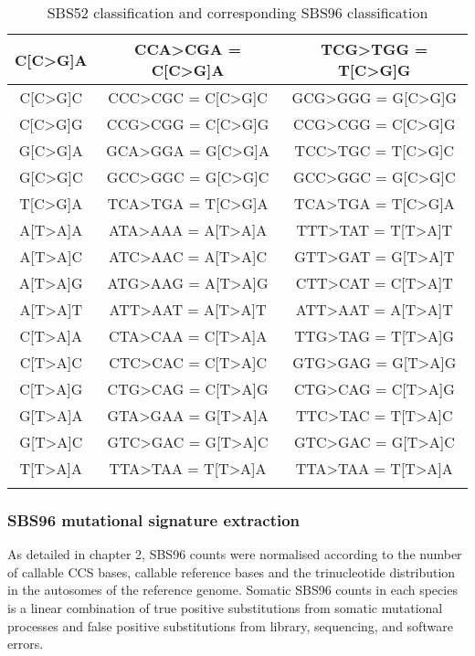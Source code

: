 \begin{longtable}{c|c|c}
\ttfamily C[C>G]A & \ttfamily CCA>CGA = C[C>G]A & \ttfamily TCG>TGG = T[C>G]G \\ \hline
\ttfamily C[C>G]C & \ttfamily CCC>CGC = C[C>G]C & \ttfamily GCG>GGG = G[C>G]G \\ \hline
\ttfamily C[C>G]G & \ttfamily CCG>CGG = C[C>G]G & \ttfamily CCG>CGG = C[C>G]G \\ \hline
\ttfamily G[C>G]A & \ttfamily GCA>GGA = G[C>G]A & \ttfamily TCC>TGC = T[C>G]C \\ \hline
\ttfamily G[C>G]C & \ttfamily GCC>GGC = G[C>G]C & \ttfamily GCC>GGC = G[C>G]C \\ \hline
\ttfamily T[C>G]A & \ttfamily TCA>TGA = T[C>G]A & \ttfamily TCA>TGA = T[C>G]A \\ \hline
\ttfamily A[T>A]A & \ttfamily ATA>AAA = A[T>A]A & \ttfamily TTT>TAT = T[T>A]T \\ \hline
\ttfamily A[T>A]C & \ttfamily ATC>AAC = A[T>A]C & \ttfamily GTT>GAT = G[T>A]T \\ \hline
\ttfamily A[T>A]G & \ttfamily ATG>AAG = A[T>A]G & \ttfamily CTT>CAT = C[T>A]T \\ \hline
\ttfamily A[T>A]T & \ttfamily ATT>AAT = A[T>A]T & \ttfamily ATT>AAT = A[T>A]T \\ \hline
\ttfamily C[T>A]A & \ttfamily CTA>CAA = C[T>A]A & \ttfamily TTG>TAG = T[T>A]G \\ \hline
\ttfamily C[T>A]C & \ttfamily CTC>CAC = C[T>A]C & \ttfamily GTG>GAG = G[T>A]G \\ \hline
\ttfamily C[T>A]G & \ttfamily CTG>CAG = C[T>A]G & \ttfamily CTG>CAG = C[T>A]G \\ \hline
\ttfamily G[T>A]A & \ttfamily GTA>GAA = G[T>A]A & \ttfamily TTC>TAC = T[T>A]C \\ \hline
\ttfamily G[T>A]C & \ttfamily GTC>GAC = G[T>A]C & \ttfamily GTC>GAC = G[T>A]C \\ \hline
\ttfamily T[T>A]A & \ttfamily TTA>TAA = T[T>A]A & \ttfamily TTA>TAA = T[T>A]A \\ \hline
\caption{SBS52 classification and corresponding SBS96 classification}
\end{longtable}
\endgroup

\subsubsection{SBS96 mutational signature extraction}


As detailed in chapter 2, SBS96 counts were normalised according to the number of callable CCS bases, callable reference bases and the trinucleotide distribution in the autosomes of the reference genome. Somatic SBS96 counts in each species is a linear combination of true positive substitutions from somatic mutational processes and false positive substitutions from library, sequencing, and software errors. 

